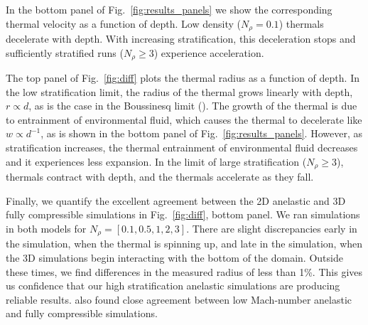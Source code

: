 In the bottom panel of Fig.~\ref{fig:results_panels} we show the corresponding thermal velocity as a function of depth.
Low density ($N_\rho = 0.1$) thermals decelerate with depth.
With increasing stratification, this deceleration stops and sufficiently stratified runs ($N_\rho \geq 3$) experience acceleration.

The top panel of Fig.~\ref{fig:diff} plots the thermal radius as a function of depth.
In the low stratification limit, the radius of the thermal grows linearly with depth, $r \propto d$, as is the case in the Boussinesq limit (\LJ).
The growth of the thermal is due to entrainment of environmental fluid, which causes the thermal to decelerate like $w \propto d^{-1}$, as is shown in the bottom panel of Fig.~\ref{fig:results_panels}.
However, as stratification increases, the thermal entrainment of environmental fluid decreases and it experiences less expansion.
In the limit of large stratification ($N_\rho \geq 3$), thermals contract with depth, and the thermals accelerate as they fall.

Finally, we quantify the excellent agreement between the 2D anelastic and 3D fully compressible simulations in Fig.~\ref{fig:diff}, bottom panel.
We ran simulations in both models for $N_\rho = [0.1, 0.5, 1, 2, 3]$.
There are slight discrepancies early in the simulation, when the thermal is spinning up, and late in the simulation, when the 3D simulations begin interacting with the bottom of the domain.
Outside these times, we find differences in the measured radius of less than 1\%.
This gives us confidence that our high stratification anelastic simulations are producing reliable results.
\cite{lecoanet&all2014} also found close agreement between low Mach-number anelastic and fully compressible simulations.

